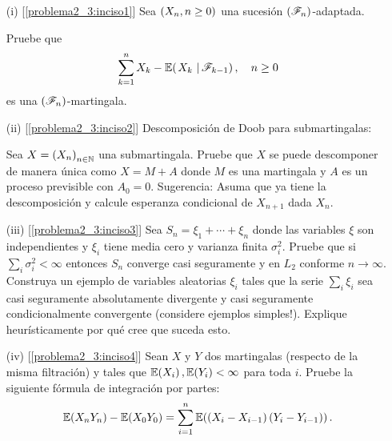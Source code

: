 \begin{problema}
    \begin{enumerate}
        \item[(i)]        [\ref{problema2_3:inciso1}]
            Sea $\left( X_n,n\geq 0\right) $ una sucesi\'on $\left( \mathscr{F}_n\right) $-adaptada.\par
            Pruebe que        
            \begin{align}
                \sum_{k=1}^n X_k-\espc{X_k}{\F_{k-1}}, \quad n\geq 0
            \end{align}
            es una $\left( \mathscr{F}_n\right) $-martingala.
        
        \item[(ii)]        [\ref{problema2_3:inciso2}]
            Descomposici\'on de Doob para submartingalas:\par
            Sea $X=\left( X_n\right) _{n\in\mathbb{N}}$ una submartingala. 
            Pruebe que $X$ se puede descomponer de manera \'unica como $X=M+A$ donde $M$ es una martingala y $A$ 
            es un proceso previsible con $A_0=0$. Sugerencia: Asuma que ya tiene la descomposici\'on y calcule 
            esperanza condicional de $X_{n+1}$ dada $X_n$. 
        
        \item[(iii)]    [\ref{problema2_3:inciso3}]
            Sea $S_n=\xi_1+\cdots+\xi_n$ donde las variables $\xi$ son independientes y $\xi_i$ tiene 
            media cero y varianza finita $\sigma_i^2$. Pruebe que si $\sum_i \sigma_i^2<\infty$ entonces 
            $S_n$ converge casi seguramente y en $L_2$ conforme $n\to\infty$. Construya un ejemplo de 
            variables aleatorias $\xi_i$ tales que la serie $\sum_i \xi_i$ sea casi seguramente absolutamente 
            divergente y casi seguramente condicionalmente convergente (considere ejemplos simples!). 
            Explique heur\'isticamente por qu\'e cree que suceda esto.
        
        \item[(iv)]        [\ref{problema2_3:inciso4}]
            Sean $X$ y $Y$ dos martingalas (respecto de la misma filtraci\'on) y tales que $\mathbb{E}\! \left( X_i \right),\mathbb{E}\! \left( Y_i \right)<\infty$ 
            para toda $i$. Pruebe la siguiente f\'ormula de integraci\'on por partes: 
            \begin{align}
                \mathbb{E}\! \left( X_nY_n \right)-\mathbb{E}\! \left( X_0Y_0 \right)=\sum_{i=1}^n \mathbb{E}\! \left( \left( X_i-X_{i-1}\right) \left( Y_i-Y_{i-1}\right)  \right). 
            \end{align}
        

\end{enumerate}
\end{problema}
